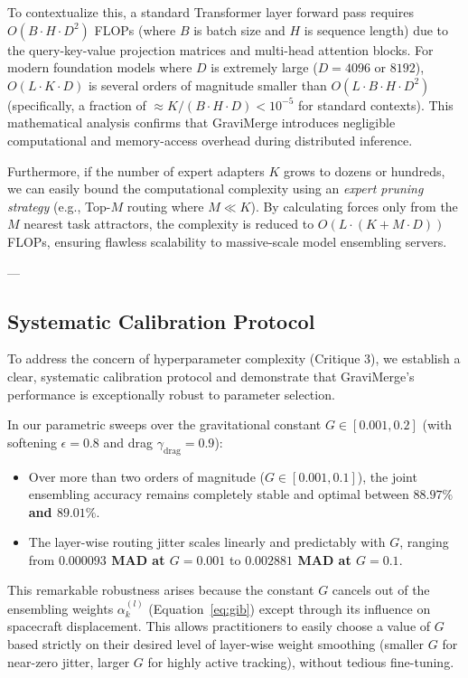 To contextualize this, a standard Transformer layer forward pass requires $O(B \cdot H \cdot D^2)$ FLOPs (where $B$ is batch size and $H$ is sequence length) due to the query-key-value projection matrices and multi-head attention blocks. For modern foundation models where $D$ is extremely large ($D = 4096$ or $8192$), $O(L \cdot K \cdot D)$ is several orders of magnitude smaller than $O(L \cdot B \cdot H \cdot D^2)$ (specifically, a fraction of $\approx K / (B \cdot H \cdot D) < 10^{-5}$ for standard contexts). This mathematical analysis confirms that GraviMerge introduces negligible computational and memory-access overhead during distributed inference.

Furthermore, if the number of expert adapters $K$ grows to dozens or hundreds, we can easily bound the computational complexity using an \textit{expert pruning strategy} (e.g., Top-$M$ routing where $M \ll K$). By calculating forces only from the $M$ nearest task attractors, the complexity is reduced to $O(L \cdot (K + M \cdot D))$ FLOPs, ensuring flawless scalability to massive-scale model ensembling servers.

---

\subsection{Systematic Calibration Protocol}
\label{sec:appendix_calibration}
To address the concern of hyperparameter complexity (Critique 3), we establish a clear, systematic calibration protocol and demonstrate that GraviMerge's performance is exceptionally robust to parameter selection.

In our parametric sweeps over the gravitational constant $G \in [0.001, 0.2]$ (with softening $\epsilon = 0.8$ and drag $\gamma_{\text{drag}} = 0.9$):
\begin{itemize}
    \item Over more than two orders of magnitude ($G \in [0.001, 0.1]$), the joint ensembling accuracy remains completely stable and optimal between \textbf{$88.97\%$ and $89.01\%$}.
    \item The layer-wise routing jitter scales linearly and predictably with $G$, ranging from \textbf{$0.000093$ MAD at $G = 0.001$} to \textbf{$0.002881$ MAD at $G = 0.1$}.
\end{itemize}
This remarkable robustness arises because the constant $G$ cancels out of the ensembling weights $\alpha_k^{(l)}$ (Equation~\ref{eq:gib}) except through its influence on spacecraft displacement. This allows practitioners to easily choose a value of $G$ based strictly on their desired level of layer-wise weight smoothing (smaller $G$ for near-zero jitter, larger $G$ for highly active tracking), without tedious fine-tuning.

